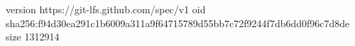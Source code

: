 version https://git-lfs.github.com/spec/v1
oid sha256:f94d30ea291c1b6009a311a9f64715789d55bb7c72f9244f7db6dd0f96c7d8de
size 1312914
